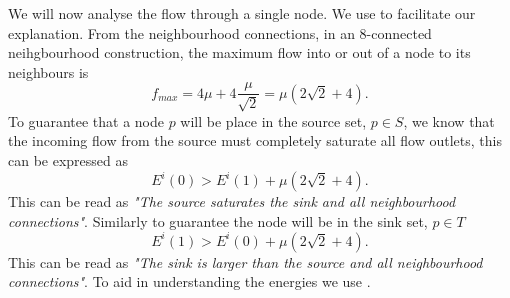 We will now analyse the flow through a single node. We use   to facilitate our explanation. From the neighbourhood connections, in an 8-connected neihgbourhood construction, the maximum flow into or out of a node to its neighbours is 
\begin{equation}
	f_{max} = 4\mu + 4\frac{\mu}{\sqrt{2}} = \mu \left( 2\sqrt{2} + 4\right).
	\label{eq:neighbourhoodsaturation}
\end{equation}
To guarantee that a node $p$ will be place in the source set, $p \in S$, we know that the incoming flow from the source must completely saturate all flow outlets, this can be expressed as
\begin{equation}
	E^i(0) > E^i(1) + \mu \left( 2\sqrt{2} + 4\right).
	\label{eq:sourcesaturation}
\end{equation}
This can be read as \textit{"The source saturates the sink and all neighbourhood connections"}.
Similarly to guarantee the node will be in the sink set, $p \in T$
\begin{equation}
E^i(1) > E^i(0) + \mu \left( 2\sqrt{2} + 4\right).
\end{equation}
This can be read as \textit{"The sink is larger than the source and all neighbourhood connections"}. To aid in understanding the energies we use .

